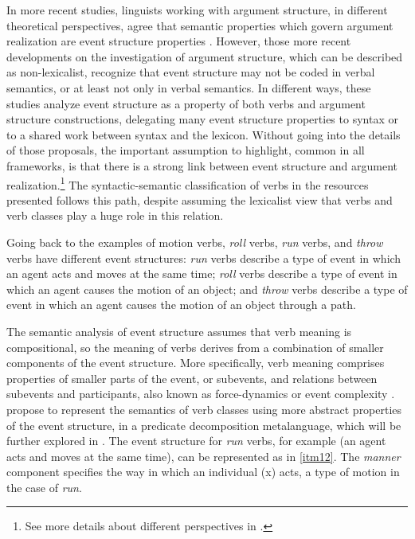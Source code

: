 \documentclass[english]{textolivre}
\begin{document}
In more recent studies, linguists working with argument structure, in different theoretical perspectives, agree that semantic properties which govern argument realization are event structure properties \cite{goldberg_constructions:_1995,croft_verbsaspect_2012,ramchand_situations_2018,beavers_roots_2020}. However, those more recent developments on the investigation of argument structure, which can be described as non-lexicalist, recognize that event structure may not be coded in verbal semantics, or at least not only in verbal semantics. In different ways, these studies analyze event structure as a property of both verbs and argument structure constructions, delegating many event structure properties to syntax or to a shared work between syntax and the lexicon. Without going into the details of those proposals, the important assumption to highlight, common in all frameworks, is that there is a strong link between event structure and argument realization.\footnote{See more details about different perspectives in \textcite{levin_argument_2018}.} The syntactic-semantic classification of verbs in the resources presented follows this path, despite assuming the lexicalist view that verbs and verb classes play a huge role in this relation.

Going back to the examples of motion verbs, \textit{roll} verbs, \textit{run} verbs, and \textit{throw} verbs have different event structures: \textit{run} verbs describe a type of event in which an agent acts and moves at the same time; \textit{roll} verbs describe a type of event in which an agent causes the motion of an object; and \textit{throw} verbs describe a type of event in which an agent causes the motion of an object through a path.

The semantic analysis of event structure assumes that verb meaning is compositional, so the meaning of verbs derives from a combination of smaller components of the event structure. More specifically, verb meaning comprises properties of smaller parts of the event, or subevents, and relations between subevents and participants, also known as force-dynamics or event complexity \cite{levin_argument_2005,croft_verbsaspect_2012}. \textcite{butt_building_1998} propose to represent the semantics of verb classes using more abstract properties of the event structure, in a predicate decomposition metalanguage, which will be further explored in . The event structure for \textit{run} verbs, for example (an agent acts and moves at the same time), can be represented as in \ref{itm12}. The \textit{manner} component specifies the way in which an individual (x) acts, a type of motion in the case of \textit{run}.
\end{document}
